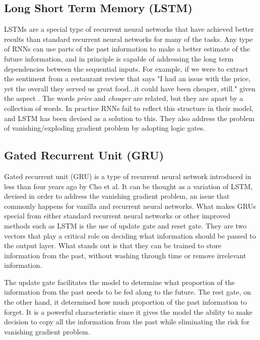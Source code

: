 \documentclass[comsoc,conference]{IEEEtran}
\begin{document}
\subsection{Long Short Term Memory (LSTM)}

LSTMs are a special type of recurrent neural networks that have achieved better results than standard recurrent neural networks for many of the tasks. Any type of RNNs can use parts of the past information to make a better estimate of the future information, and in principle is capable of addressing the long term dependencies between the sequential inputs. For example, if we were to extract the sentiment from a restaurant review that says "I had an issue with the price, yet the overall they served us great food...it could have been cheaper, still." given the aspect . The words \textit{price} and \textit{cheaper} are related, but they are apart by a collection of words. In practice RNNs fail to reflect this structure in their model, and LSTM has been devised as a solution to this. They also address the problem of vanishing/exploding gradient problem by adopting logic gates.

\subsection{Gated Recurrent Unit (GRU)}

Gated recurrent unit (GRU) is a type of recurrent neural network introduced in less than four years ago by Cho et al. It can be thought as a variation of LSTM, devised in order to address the vanishing gradient problem, an issue that commonly happens for vanilla and recurrent neural networks. What makes GRUs special from either standard recurrent neural networks or other improved methods such as LSTM is the use of update gate and reset gate. They are two vectors that play a critical role on deciding what information should be passed to the output layer. What stands out is that they can be trained to store information from the past, without washing through time or remove irrelevant information.

The update gate facilitates the model to determine what proportion of the information from the past needs to be fed along to the future. The rest gate, on the other hand, it determined how much proportion of the past information to forget. It is a powerful characteristic since it gives the model the ability to make decision to copy all the information from the past while eliminating the risk for vanishing gradient problem.
\end{document}
